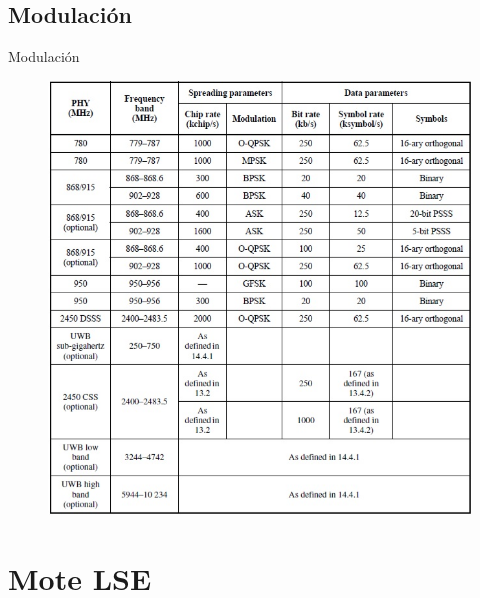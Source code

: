 \documentclass[aspectratio=169]{beamer}
\begin{document}
\subsection[Modulación]{Modulación}

\begin{frame}{Modulación}
\begin{minipage}[c]{1.0\linewidth}
\begin{figure}[H]
	\includegraphics[height=1\textheight]{./imagenes/modulaciones.jpg}
		\end{figure}	
\end{minipage}
\end{frame}

\section{Mote LSE}

\end{document}
